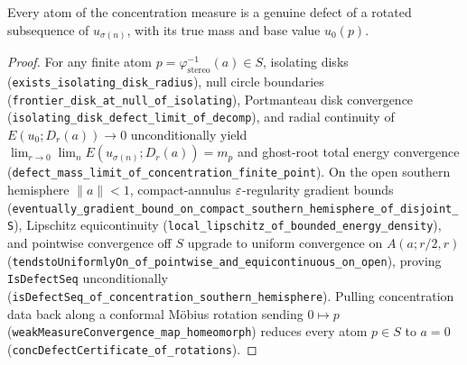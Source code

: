 \begin{theorem}
\label{cert_concdefect}
\leanok
{}
Every atom of the concentration measure is a genuine defect of a rotated subsequence of $u_{\sigma(n)}$,
with its true mass and base value $u_0(p)$.
\end{theorem}
\begin{proof}\leanok For any finite atom $p=\varphi_{\mathrm{stereo}}^{-1}(a)\in S$, isolating disks
(\texttt{exists\_isolating\_disk\_radius}), null circle boundaries (\texttt{frontier\_disk\_at\_null\_of\_isolating}),
Portmanteau disk convergence (\texttt{isolating\_disk\_defect\_limit\_of\_decomp}), and radial continuity of
$E(u_0;D_r(a))\to 0$ unconditionally yield $\lim_{r\to 0}\lim_n E(u_{\sigma(n)};D_r(a))=m_p$ and ghost-root
total energy convergence (\texttt{defect\_mass\_limit\_of\_concentration\_finite\_point}). On the open
southern hemisphere $\|a\|<1$, compact-annulus $\varepsilon$-regularity gradient bounds
(\texttt{eventually\_gradient\_bound\_on\_compact\_southern\_hemisphere\_of\_disjoint\_S}), Lipschitz
equicontinuity (\texttt{local\_lipschitz\_of\_bounded\_energy\_density}), and pointwise convergence off $S$
upgrade to uniform convergence on $A(a;r/2,r)$
(\texttt{tendstoUniformlyOn\_of\_pointwise\_and\_equicontinuous\_on\_open}), proving
\texttt{IsDefectSeq} unconditionally (\texttt{isDefectSeq\_of\_concentration\_southern\_hemisphere}).
Pulling concentration data back along a conformal M\"obius rotation sending $0\mapsto p$
(\texttt{weakMeasureConvergence\_map\_homeomorph}) reduces every atom $p\in S$ to $a=0$
(\texttt{concDefectCertificate\_of\_rotations}).\end{proof}

